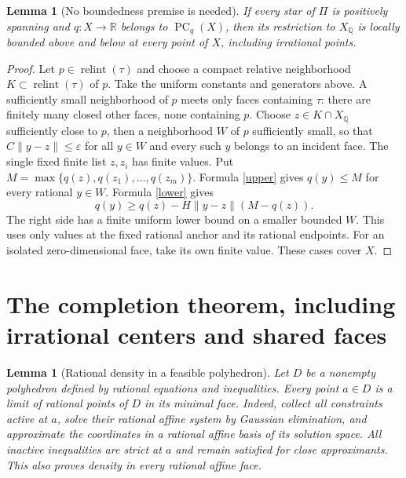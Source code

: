 \documentclass[11pt]{article}
\newtheorem{lemma}[theorem]{Lemma}
\newcommand{\R}{\mathbb R}
\newcommand{\Q}{\mathbb Q}
\newcommand{\PC}{\operatorname{PC}}
\newcommand{\relint}{\operatorname{relint}}
\begin{document}
\begin{lemma}[No boundedness premise is needed]\label{bounds}
If every star of $\Pi$ is positively spanning and $q:X\to\R$ belongs to $\PC_q(X)$, then its restriction to $X_\Q$ is locally bounded above and below at every point of $X$, including irrational points.
\end{lemma}
\begin{proof}
Let $p\in\relint(\tau)$ and choose a compact relative neighborhood $K\subset\relint(\tau)$ of $p$. Take the uniform constants and generators above. A sufficiently small neighborhood of $p$ meets only faces containing $\tau$: there are finitely many closed other faces, none containing $p$. Choose $z\in K\cap X_\Q$ sufficiently close to $p$, then a neighborhood $W$ of $p$ sufficiently small, so that $C\|y-z\|\leq\varepsilon$ for all $y\in W$ and every such $y$ belongs to an incident face. The single fixed finite list $z,z_i$ has finite values. Put $M=\max\{q(z),q(z_1),\ldots,q(z_m)\}$. Formula \eqref{upper} gives $q(y)\leq M$ for every rational $y\in W$. Formula \eqref{lower} gives
\[q(y)\geq q(z)-H\|y-z\|(M-q(z)).\]
The right side has a finite uniform lower bound on a smaller bounded $W$. This uses only values at the fixed rational anchor and its rational endpoints. For an isolated zero-dimensional face, take its own finite value. These cases cover $X$.
\end{proof}

\section{The completion theorem, including irrational centers and shared faces}
\begin{lemma}[Rational density in a feasible polyhedron]\label{density}
Let $D$ be a nonempty polyhedron defined by rational equations and inequalities. Every point $a\in D$ is a limit of rational points of $D$ in its minimal face. Indeed, collect all constraints active at $a$, solve their rational affine system by Gaussian elimination, and approximate the coordinates in a rational affine basis of its solution space. All inactive inequalities are strict at $a$ and remain satisfied for close approximants. This also proves density in every rational affine face.
\end{lemma}
\end{document}
